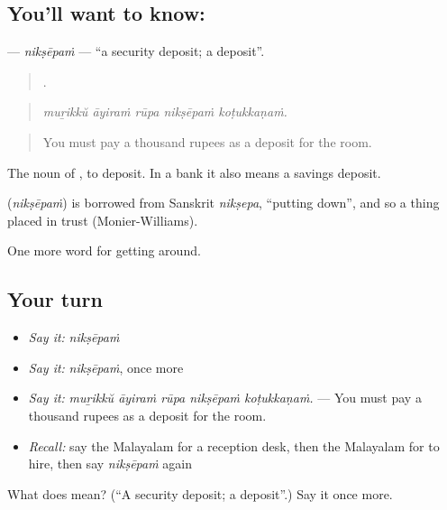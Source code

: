 \subsection*{You'll want to know: }
\textbf{} — \emph{nikṣēpaṁ} — \textquotedblleft{}a security deposit; a deposit\textquotedblright{}.

\begin{quote}
    .
\end{quote}

\begin{quote}
\emph{muṟikkŭ āyiraṁ rūpa nikṣēpaṁ koṭukkaṇaṁ.}
\end{quote}

\begin{quote}
You must pay a thousand rupees as a deposit for the room.
\end{quote}

The noun of , to deposit. In a bank it also means a savings deposit.

\begin{cousinweb}
\textbf{} (\emph{nikṣēpaṁ}) is borrowed from Sanskrit \emph{nikṣepa}, \textquotedblleft{}putting down\textquotedblright{}, and so a thing placed in trust (Monier-Williams).
\end{cousinweb}

\begin{grammarlens}[title={What you've built}]
One more word for getting around.
\end{grammarlens}

\subsection*{Your turn}
\begin{itemize}
\raggedright
  \item \emph{Say it:} \emph{nikṣēpaṁ}
  \item \emph{Say it:} \emph{nikṣēpaṁ}, once more
  \item \emph{Say it:} \emph{muṟikkŭ āyiraṁ rūpa nikṣēpaṁ koṭukkaṇaṁ.} — You must pay a thousand rupees as a deposit for the room.
  \item \emph{Recall:} say the Malayalam for a reception desk, then the Malayalam for to hire, then say \emph{nikṣēpaṁ} again
\end{itemize}

\begin{tcolorbox}[breakable,colback=teal!4,colframe=teal!35!black,title={Before you move on}]
What does  mean? (\textquotedblleft{}A security deposit; a deposit\textquotedblright{}.) Say it once more.
\end{tcolorbox}
